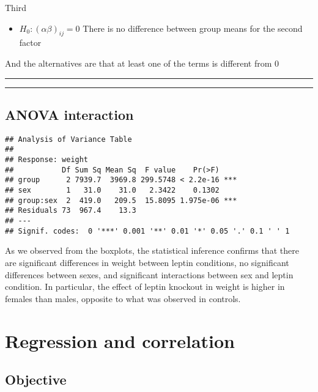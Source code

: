 \documentclass[
]{book}
\providecommand{\tightlist}{%
  \setlength{\itemsep}{0pt}\setlength{\parskip}{0pt}}
\begin{document}
Third

\begin{itemize}
\tightlist
\item
  \(H_0: (\alpha\beta)_{ij}=0\) There is no difference between group means for the second factor
\end{itemize}

And the alternatives are that at least one of the terms is different from \(0\)

\begin{center}\rule{0.5\linewidth}{0.5pt}\end{center}

\begin{center}\rule{0.5\linewidth}{0.5pt}\end{center}

\hypertarget{anova-interaction-5}{%
\section{ANOVA interaction}\label{anova-interaction-5}}

\begin{verbatim}
## Analysis of Variance Table
## 
## Response: weight
##           Df Sum Sq Mean Sq  F value    Pr(>F)    
## group      2 7939.7  3969.8 299.5748 < 2.2e-16 ***
## sex        1   31.0    31.0   2.3422    0.1302    
## group:sex  2  419.0   209.5  15.8095 1.975e-06 ***
## Residuals 73  967.4    13.3                       
## ---
## Signif. codes:  0 '***' 0.001 '**' 0.01 '*' 0.05 '.' 0.1 ' ' 1
\end{verbatim}

As we observed from the boxplots, the statistical inference confirms that there are significant differences in weight between leptin conditions, no significant differences between sexes, and significant interactions between sex and leptin condition. In particular, the effect of leptin knockout in weight is higher in females than males, opposite to what was observed in controls.

\hypertarget{regression-and-correlation}{%
\chapter{Regression and correlation}\label{regression-and-correlation}}

\hypertarget{objective-17}{%
\section{Objective}\label{objective-17}}
\end{document}
